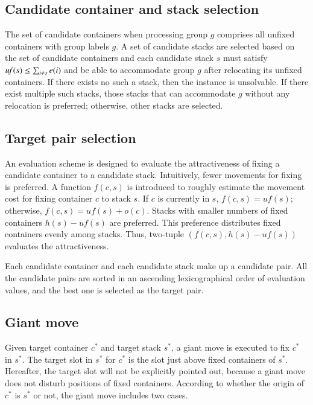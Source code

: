 \documentclass[review,3p,times,authoryear,12pt]{elsarticle}
\begin{document}
\subsection{Candidate container and stack selection}
\label{sec:can}

The set of candidate containers when processing group $g$ comprises all unfixed containers with group labels $g$.
A set of candidate stacks are selected based on the set of candidate containers and each candidate stack $s$ must satisfy $\id{uf}(s)\le\sum_{i\neq s}e(i)$ and be able to accommodate group $g$ after relocating its unfixed containers.
If there exists no such a stack, then the instance is unsolvable.
If there exist multiple such stacks, those stacks that can accommodate $g$ without any relocation is preferred; otherwise, other stacks are selected.

\subsection{Target pair selection}
\label{sec:tar}

An evaluation scheme is designed to evaluate the attractiveness of fixing a candidate container to a candidate stack.
Intuitively, fewer movements for fixing is preferred.
A function $f(c,s)$ is introduced to roughly estimate the movement cost for fixing container $c$ to stack $s$.
If $c$ is currently in $s$, $f(c,s)=\mathit{uf}(s)$; otherwise, $f(c,s)=\mathit{uf}(s)+o(c)$.
Stacks with smaller numbers of fixed containers $h(s)-\mathit{uf}(s)$ are preferred.
This preference distributes fixed containers evenly among stacks.
Thus, two-tuple $(f(c,s), h(s)-\mathit{uf}(s))$ evaluates the attractiveness.

Each candidate container and each candidate stack make up a candidate pair.
All the candidate pairs are sorted in an ascending lexicographical order of evaluation values, and the best one is selected as the target pair.

\subsection{Giant move}

Given target container $c^*$ and target stack $s^*$, a giant move is executed to fix $c^*$ in $s^*$.
The target slot in $s^*$ for $c^*$ is the slot just above fixed containers of $s^*$.
Hereafter, the target slot will not be explicitly pointed out, because a giant move does not disturb positions of fixed containers.
According to whether the origin of $c^*$ is $s^*$ or not, the giant move includes two cases.
\end{document}
